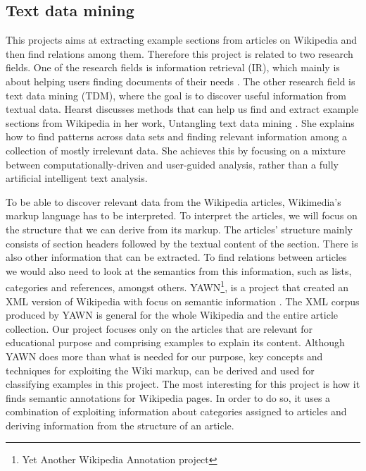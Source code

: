 \subsection{Text data mining} \label{sec_tdm}
This projects aims at extracting example sections from articles on Wikipedia and then find relations among them. Therefore this project is related to two research fields. One of the research fields is information retrieval (IR), which mainly is about helping users finding documents of their needs \cite{irbook}. The other research field is text data mining (TDM), where the goal is to discover useful information from textual data. Hearst discusses methods that can help us find and extract example sections from Wikipedia in her work, Untangling text data mining \cite{untanglingTDM}. She explains how to find patterns across data sets and finding relevant information among a collection of mostly irrelevant data. She achieves this by focusing on a mixture between computationally-driven and user-guided analysis, rather than a fully artificial intelligent text analysis.


To be able to discover relevant data from the Wikipedia articles, Wikimedia's markup language has to be interpreted.  To interpret the articles, we will focus on the structure that we can derive from its markup. The articles' structure mainly consists of section headers followed by the textual content of the section. There is also other information that can be extracted. To find relations between articles we would also need to look at the semantics from this information, such as lists, categories and references, amongst others. YAWN\footnote{Yet Another Wikipedia Annotation project}, is a project that created an XML version of Wikipedia with focus on semantic information \cite{yawn}. The XML corpus produced by YAWN is general for the whole Wikipedia and the entire article collection. Our project focuses only on the articles that are relevant for educational purpose and comprising examples to explain its content. Although YAWN does more than what is needed for our purpose, key concepts and techniques for exploiting the Wiki markup, can be derived and used for classifying examples in this project. The most interesting for this project is how it finds semantic annotations for Wikipedia pages. In order to do so, it uses a combination of exploiting information about categories assigned to articles and deriving information from the structure of an article.

